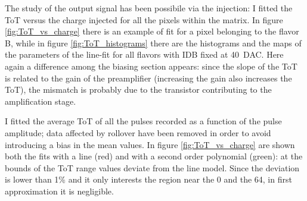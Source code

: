         The study of the output signal has been possibile via the injection: I fitted the ToT versus the charge injected for all the pixels within the matrix.
        In figure \ref{fig:ToT_vs_charge} there is an example of fit for a pixel belonging to the flavor B, while in figure \ref{fig:ToT_histograms} there are the histograms and the maps of the parameters of the line-fit for all flavors with IDB fixed at \SI{40}{DAC}. Here again a difference among the biasing section appears: since the slope of the ToT is related to the gain of the preamplifier (increasing the gain also increases the ToT), the mismatch is probably due to the transistor contributing to the amplification stage.

        I fitted the average ToT of all the pulses recorded as a function of the pulse amplitude; data affected by rollover have been removed in order to avoid introducing a bias in the mean values.
        In figure \ref{fig:ToT_vs_charge} are shown both the fits with a line (red) and with a second order polynomial (green): at the bounds of the ToT range values deviate from the line model. Since the deviation is lower than 1\% and it only interests the region near the 0 and the 64, in first approximation it is negligible. 
        
